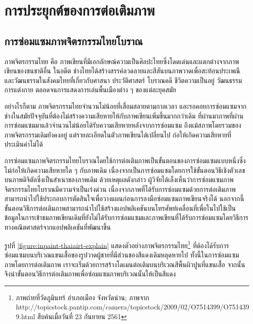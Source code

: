 \section{การประยุกต์ของการต่อเติมภาพ}
\subsection{การซ่อมแซมภาพจิตรกรรมไทยโบราณ}

\hspace{1cm} ภาพจิตรกรรมไทย คือ ภาพเขียนที่มีเอกลักษณ์ความเป็นศิลปะไทยซึ่งโดดเด่นและแตกต่างจากภาพเขียนของชนชาติอื่น ในอดีต  ช่างไทยได้สร้างสรรค์ลวดลายและสีสันบนภาพวาดเพื่อสะท้อนประเพณีและวัฒนธรรมในสังคมไทยที่เกี่ยวกับศาสนา ประวัติศาสตร์ โบราณคดี ชีวิตความเป็นอยู่ วัฒนธรรมการแต่งกาย ตลอดจนการแสดงการเล่นพื้นเมืองต่าง ๆ ของแต่ละยุคสมัย 
	
\hspace{1cm} อย่างไรก็ตาม ภาพจิตรกรรมไทยจำนวนไม่น้อยที่เสื่อมสลายตามกาลเวลา และรอคอยการซ่อมแซมจากช่างในสมัยปัจจุบันที่ต้องไม่สร้างความเสียหายให้กับภาพเขียนเพิ่มขึ้นมากกว่าเดิม  ที่ผ่านมาภาพที่ผ่านการซ่อมแซมมาแล้วจำนวนไม่น้อยได้รับความเสียหายหลังจากการซ่อมแซม ถึงแม้สภาพโดยรวมของภาพจิตรกรรมเดิมยังคงอยู่ แต่รายละเอียดในตัวภาพเขียนได้เปลี่ยนไป ก่อให้เกิดความเสียหายที่ประเมินค่าไม่ได้ 
	
\hspace{1cm} การซ่อมแซมภาพจิตรกรรมไทยโบราณโดยใช้การต่อเติมภาพเป็นขั้นตอนของการซ่อมแซมแบบหนึ่งซึ่งไม่ก่อให้เกิดความเสียหายใด ๆ กับภาพเดิม เนื่องจากเป็นการซ่อมแซมโดยการใช้ขั้นตอนวิธีเชิงตัวเลขบนภาพดิจิตัลซึ่งเป็นสำเนาของภาพเดิม ด้วยเหตุผลดังกล่าว ผู้วิจัยได้เล็งเห็นว่าการซ่อมแซมภาพจิตรกรรมไทยโบราณมีความจำเป็นเร่งด่วน เนื่องจากภาพที่ได้รับการซ่อมแซมด้วยการต่อเติมภาพสามารถนำไปใช้ประกอบการตัดสินใจเพื่อวางแผนก่อนการลงมือซ่อมแซมภาพเขียนจริงได้ นอกจากนี้ ขั้นตอนวิธีการต่อเติมภาพสามารถนำไปใช้สร้างแอปพลิเคชันบนโทรศัพท์เคลื่อนที่เพื่อในไปใช้เป็นข้อมูลในการเข้าชมภาพเขียนเดิมที่ยังไม่ได้รับการซ่อมแซมและภาพเขียนที่ได้รับการซ่อมแซมโดยวิธีการทางคณิตศาสตร์จากแอปพลิเคชันที่พัฒนาขึ้น
	
\hspace{1cm} รูปที่ \ref{figure:inpaint-thaiairt-explain} แสดงตัวอย่างภาพจิตรกรรมไทย\footnote{ภาพถ่ายที่วัดภูมินทร์ อำเภอเมือง จังหวัดน่าน; ภาพจาก http://topicstock.pantip.com/camera/topicstock/2009/02/O7514399/O7514399.html สืบค้นเมื่อวันที่ 23 กันยายน 2561} ที่ต้องได้รับการซ่อมแซมบนบริเวณแขนเสื้อของรูปวาดผู้ชายที่มีส่วนของสีแดงเดิมหลุดหายไป ทั้งนี้ในการซ่อมแซมภาพโดยการต่อเติมภาพ เราจะเริ่มด้วยการสร้างโดเมนต่อเติมบนบริเวณสีพื้นผิวปูนที่แขนเสื้อ จากนั้นจึงนำขั้นตอนวิธีการต่อเติมภาพเพื่อซ่อมแซมภาพบริเวณนั้นให้เป็นสีแดง 

